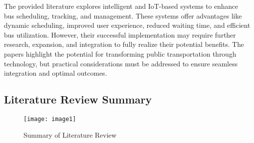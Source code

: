 \documentclass[a4paper, 12pt]{article}
\begin{document}
The provided literature explores intelligent and IoT-based systems to enhance bus scheduling, tracking, and management. These systems offer advantages like dynamic scheduling, improved user experience, reduced waiting time, and efficient bus utilization. However, their successful implementation may require further research, expansion, and integration to fully realize their potential benefits. The papers highlight the potential for transforming public transportation through technology, but practical considerations must be addressed to ensure seamless integration and optimal outcomes.

\subsection{Literature Review Summary}

\begin{figure}[htbp]
  \centering
  \texttt{[image: image1]}
  \caption{Summary of Literature Review}
  \label{fig:image1}
\end{figure}
\end{document}
